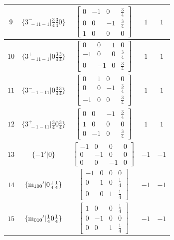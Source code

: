 \documentclass[fleqn,8pt]{jsarticle}
\begin{document}
\begin{longtable}{ccccc}
$ 9 $ & $ \{3^{-}_{\,\,-11-1}|\frac{3}{4} \frac{3}{4} 0\} $ & $ \begin{bmatrix} 0 & -1 & 0 & \frac{3}{4} \\ 0 & 0 & -1 & \frac{3}{4} \\ 1 & 0 & 0 & 0 \end{bmatrix} $ & $ 1 $ & $ 1 $ \\ \hline
$ 10 $ & $ \{3^{+}_{\,\,-11-1}|0 \frac{3}{4} \frac{3}{4}\} $ & $ \begin{bmatrix} 0 & 0 & 1 & 0 \\ -1 & 0 & 0 & \frac{3}{4} \\ 0 & -1 & 0 & \frac{3}{4} \end{bmatrix} $ & $ 1 $ & $ 1 $ \\ \hline
$ 11 $ & $ \{3^{-}_{\,\,-1-11}|0 \frac{3}{4} \frac{3}{4}\} $ & $ \begin{bmatrix} 0 & 1 & 0 & 0 \\ 0 & 0 & -1 & \frac{3}{4} \\ -1 & 0 & 0 & \frac{3}{4} \end{bmatrix} $ & $ 1 $ & $ 1 $ \\ \hline
$ 12 $ & $ \{3^{+}_{\,\,-1-11}|\frac{3}{4} 0 \frac{3}{4}\} $ & $ \begin{bmatrix} 0 & 0 & -1 & \frac{3}{4} \\ 1 & 0 & 0 & 0 \\ 0 & -1 & 0 & \frac{3}{4} \end{bmatrix} $ & $ 1 $ & $ 1 $ \\ \hline
$ 13 $ & $ \{-1{}'|0\} $ & $ \begin{bmatrix} -1 & 0 & 0 & 0 \\ 0 & -1 & 0 & 0 \\ 0 & 0 & -1 & 0 \end{bmatrix} $ & $ -1 $ & $ -1 $ \\ \hline
$ 14 $ & $ \{{\rm m}_{100}{}'|0 \frac{1}{4} \frac{1}{4}\} $ & $ \begin{bmatrix} -1 & 0 & 0 & 0 \\ 0 & 1 & 0 & \frac{1}{4} \\ 0 & 0 & 1 & \frac{1}{4} \end{bmatrix} $ & $ -1 $ & $ -1 $ \\ \hline
$ 15 $ & $ \{{\rm m}_{010}{}'|\frac{1}{4} 0 \frac{1}{4}\} $ & $ \begin{bmatrix} 1 & 0 & 0 & \frac{1}{4} \\ 0 & -1 & 0 & 0 \\ 0 & 0 & 1 & \frac{1}{4} \end{bmatrix} $ & $ -1 $ & $ -1 $ \\ \hline

\end{longtable}
\end{document}

